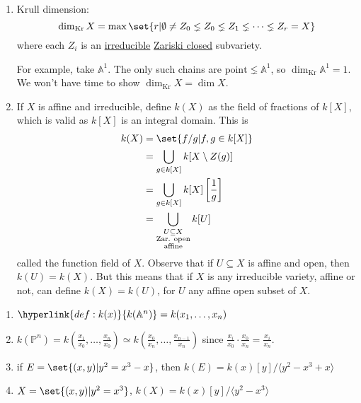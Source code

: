 \documentclass{article}
\newcommand{\A}{\mathbb{A}}
\newcommand{\proj}{\mathbb{P}}
\newcommand{\krdim}{\dim_{\text{Kr}}}
\begin{document}
\begin{enumerate}[label=(\arabic*)]
    \item Krull dimension:
        \begin{equation*}
            \krdim X = \max\set{r | \emptyset \neq Z_0 \lneq Z_0 \lneq Z_1 \lneq \dotsb \lneq Z_r = X}
        \end{equation*}
        where each $Z_i$ is an \hyperlink{def:reducible}{irreducible} \hyperlink{def:zariski}{Zariski closed} subvariety.

        For example, take $\A^1$. The only such chains are $\text{point} \lneq \A^1$, so $\krdim \A^1 = 1$.
        We won't have time to show $\krdim X = \dim X$.
    \item If $X$ is affine and irreducible, define \hypertarget{def:k(x)}{$k(X)$} as the field of fractions of \hyperlink{def:kx}{$k[X]$}, which is valid as $k[X]$ is an integral domain.
        This is
        \begin{align*}
            k(X) &= \set{f/g | f, g \in k[X]} \\
                 &= \bigcup_{g \in k[X]} k[X \setminus Z(g)] \\
                 &= \bigcup_{g \in k[X]} k[X]\left[\frac{1}{g}\right] \\
                 &= \bigcup_{\substack{U \subseteq X \\\text{Zar. open}\\\text{affine}}} k[U]
        \end{align*}
        called the function field of $X$.
        Observe that if $U \subseteq X$ is affine and open, then $k(U) = k(X)$.
        But this means that if $X$ is any irreducible variety, affine or not, can define $k(X) = k(U)$, for $U$ any affine open subset of $X$.
\end{enumerate}
\begin{eg}\leavevmode
    \begin{enumerate}[label=(\roman*)]
        \item $\hyperlink{def:k(x)}{k(\A^n)} = k(x_1, \dotsc, x_n)$
        \item $k(\proj^n) = k(\frac{x_1}{x_0}, \dotsc, \frac{x_n}{x_0}) \simeq k(\frac{x_0}{x_n}, \dotsc, \frac{x_{n-1}}{x_n})$ since $\frac{x_i}{x_0} \cdot \frac{x_0}{x_n} = \frac{x_i}{x_n}$.
        \item if $E = \set{(x, y) | y^2 = x^3 - x}$, then $k(E) = k(x)[y]/\langle y^2 - x^3 + x \rangle$
        \item $X = \set{(x, y) | y^2 = x^3}$, $k(X) = k(x)[y] / \langle y^2 - x^3 \rangle$
    \end{enumerate}
\end{eg}
\end{document}
